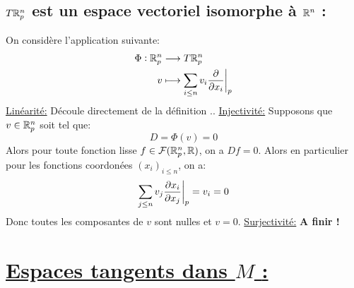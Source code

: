    \subsection*{\( T\mathbb{R}^n_p \) est un espace vectoriel isomorphe à \( \mathbb{R}^n \) {:}}
   On considère l'application suivante:
   \[ 
      \begin{aligned}
         \Phi : \mathbb{R}^n_p &\longrightarrow T\mathbb{R}^n_p \\
         v &\longmapsto \sum_{i \leq n} v_i \frac{\partial }{\partial x_i}\biggr|_p
      \end{aligned} 
   \]
   \uline{Linéarité:} Découle directement de la définition ..\+
   \uline{Injectivité:} Supposons que \( v \in \mathbb{R}^n_p \) soit tel que:
   \[ 
      D = \Phi(v) = 0
   \]
   Alors pour toute fonction lisse \( f \in \mathcal{F}(\mathbb{R}^n_p, \mathbb{R}) \), on a \( Df = 0 \). Alors en particulier pour les fonctions coordonées \( (x_i)_{i \leq n} \), on a:
   \[ 
      \sum_{j \leq n}v_j \frac{\partial x_i}{\partial x_j}\biggr|_p = v_i = 0
   \]
   Donc toutes les composantes de \( v \) sont nulles et \( v = 0 \).\+
   \uline{Surjectivité:}
   {\textbf{\color{red} A finir !}}

\section*{\uline{Espaces tangents dans \( M \) {:}}}
